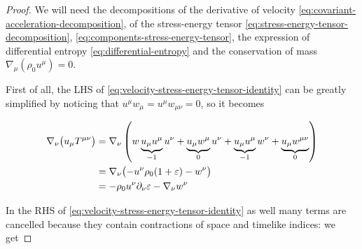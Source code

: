 \documentclass[main.tex]{subfiles}
\begin{document}
\begin{proof}
    We will need the decompositions of
    the derivative of velocity \eqref{eq:covariant-acceleration-decomposition},
    of the stress-energy tensor \eqref{eq:stress-energy-tensor-decomposition}, \eqref{eq:components-stress-energy-tensor},
    the expression of differential entropy \eqref{eq:differential-entropy}
    and the conservation of mass \(\nabla_\mu (\rho_0 u^\mu) = 0\).

    First of all, the LHS of \eqref{eq:velocity-stress-energy-tensor-identity} can be greatly simplified by noticing that \(u^\mu w_\mu = u^\mu w_{\mu \nu} = 0\), so it becomes %

    \vspace{-1cm}

    \begin{subequations}
    \begin{align}
        \nabla_\nu \qty(u_\mu T ^{\mu \nu}) &= \nabla_\nu \left( w \underbrace{u_\mu u^\mu}_{-1} u^\nu + \underbrace{u_\mu w^\mu}_{0} u^\nu + \underbrace{ u_\mu u^\mu}_{-1} w^\nu + \underbrace{u_\mu w ^{\mu \nu}}_{0}\right) \\
         &= \nabla_\nu \qty(- u^\nu \rho_0 (1 + \varepsilon) - w^\nu) \\
         &=  - \rho_0 u^\nu \partial_\nu \varepsilon - \nabla_\nu w^\nu
    \end{align}
    \end{subequations}

    In the RHS of \eqref{eq:velocity-stress-energy-tensor-identity} as well many terms are cancelled because they contain contractions of space and timelike indices: we get


\end{proof}
\end{document}
